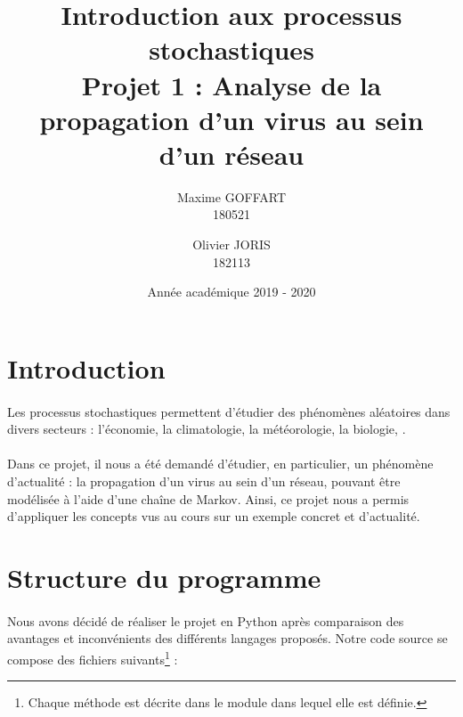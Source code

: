 \documentclass[a4paper, 12pt, oneside]{article}
\title{\textbf{Introduction aux processus stochastiques}\\
	   Projet 1 : Analyse de la propagation d'un virus au sein d'un réseau}
\author{Maxime GOFFART \\180521 \and Olivier JORIS\\182113}
\date{Année académique 2019 - 2020}
\begin{document}
\maketitle
\newpage

\tableofcontents
\newpage

\section{Introduction}

\paragraph{}Les processus stochastiques permettent d'étudier des phénomènes aléatoires dans divers secteurs : l'économie, la climatologie, la météorologie, la biologie, \dotso.

\paragraph{}Dans ce projet, il nous a été demandé d'étudier, en particulier, un phénomène d'actualité : la propagation d'un virus au sein d'un réseau, pouvant être modélisée à l'aide d'une chaîne de Markov. Ainsi, ce projet nous a permis d'appliquer les concepts vus au cours sur un exemple concret et d'actualité.

\section{Structure du programme} 
\paragraph{}Nous avons décidé de réaliser le projet en Python après comparaison des avantages et inconvénients des différents langages proposés. Notre code source se compose des fichiers suivants\footnote{Chaque méthode est décrite dans le module dans lequel elle est définie.} :
\end{document}
